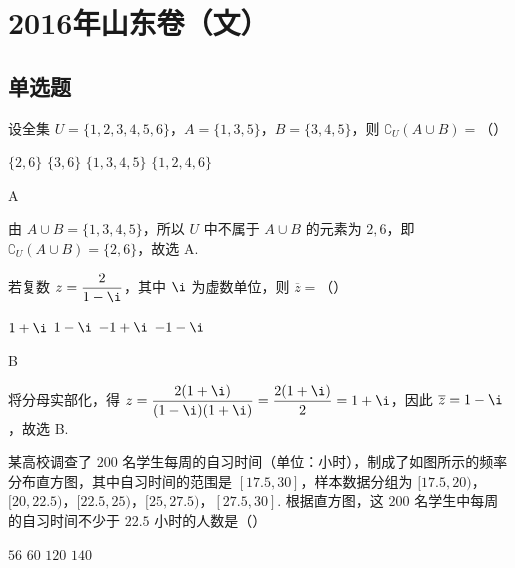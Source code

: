 \chapter{2016年山东卷（文）}

\section{单选题}

\begin{problem}
设全集 \(U=\{1,2,3,4,5,6\}\)，\(A=\{1,3,5\}\)，\(B=\{3,4,5\}\)，则 \(\complement_U\left(A\cup B\right)=\)（\quad）

\choices
    {\(\{2,6\}\)}
    {\(\{3,6\}\)}
    {\(\{1,3,4,5\}\)}
    {\(\{1,2,4,6\}\)}
\end{problem}

\begin{answer}
A
\end{answer}

\begin{solution}
由 \(A\cup B=\{1,3,4,5\}\)，所以 \(U\) 中不属于 \(A\cup B\) 的元素为 \(2,6\)，即 \(\complement_U\left(A\cup B\right)=\{2,6\}\)，故选 A.
\end{solution}

\begin{problem}
若复数 \(z=\dfrac{2}{1-\i}\)，其中 \(\i\) 为虚数单位，则 \(\overline{z}=\)（\quad）

\choices
    {\(1+\i\)}
    {\(1-\i\)}
    {\(-1+\i\)}
    {\(-1-\i\)}
\end{problem}

\begin{answer}
B
\end{answer}

\begin{solution}
将分母实部化，得 \(z=\dfrac{2(1+\i)}{(1-\i)(1+\i)}=\dfrac{2(1+\i)}{2}=1+\i\)，因此 \(\overline{z}=1-\i\)，故选 B.
\end{solution}

\begin{problem}
某高校调查了 \(200\) 名学生每周的自习时间（单位：小时），制成了如图所示的频率分布直方图，其中自习时间的范围是 \([17.5,30]\)，样本数据分组为 \([17.5,20)\)，\([20,22.5)\)，\([22.5,25)\)，\([25,27.5)\)，\([27.5,30]\). 根据直方图，这 \(200\) 名学生中每周的自习时间不少于 \(22.5\) 小时的人数是（\quad）


\choices
    {\(56\)}
    {\(60\)}
    {\(120\)}
    {\(140\)}
\end{problem}

